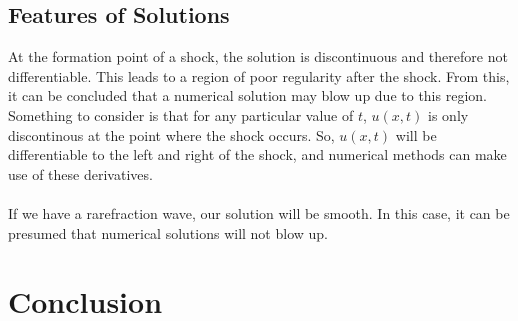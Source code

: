 \documentclass{myproject}
\begin{document}
\subsection{Features of Solutions}
At the formation point of a shock, the solution is discontinuous and therefore not differentiable. This leads to a region of poor regularity after the shock. From this, it can be concluded that a numerical solution may blow up due to this region. Something to consider is that for any particular value of $t$, $u(x, t)$ is only discontinous at the point where the shock occurs. So, $u(x,t)$ will be differentiable to the left and right of the shock, and numerical methods can make use of these derivatives.
\\\\If we have a rarefraction wave, our solution will be smooth. In this case, it can be presumed that numerical solutions will not blow up.

\section{Conclusion}

\nocite{choksi2022}
\nocite{iserles2009}
\nocite{kutz2013}
\nocite{trefethen2001}
\printbibliography
\end{document}
